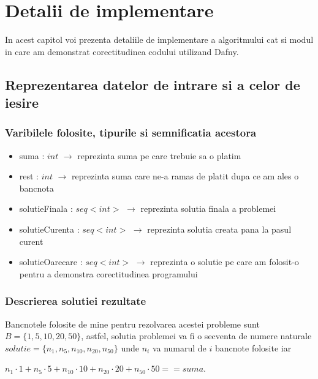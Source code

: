 
\chapter{Detalii de implementare}
In acest capitol voi prezenta detaliile de implementare a algoritmului cat si modul in care am demonstrat corectitudinea codului utilizand Dafny.
\section{Reprezentarea datelor de intrare si a celor de iesire}

\subsection{Varibilele folosite, tipurile si semnificatia acestora}

\begin{itemize}
	\item suma : $int$ $\rightarrow$ reprezinta suma pe care trebuie sa o platim 
	\item rest : $int$ $\rightarrow$ reprezinta suma care ne-a ramas de platit dupa ce am ales o bancnota
	\item solutieFinala : $seq<int>$ $\rightarrow$ reprezinta solutia finala a problemei 
	\item solutieCurenta : $seq<int>$ $\rightarrow$ reprezinta solutia creata pana la pasul curent
	\item solutieOarecare  : $seq<int>$ $\rightarrow$ reprezinta o solutie pe care am folosit-o pentru a demonstra corectitudinea programului
\end{itemize}

\subsection{Descrierea solutiei rezultate}
Bancnotele folosite de mine pentru rezolvarea acestei probleme sunt $B = \{1, 5, 10, 20, 50\}$, astfel, solutia problemei va fi o secventa de numere naturale $ solutie = \{n_1,n_5,n_{10},n_{20},n_{50} \}$ unde $n_i$ va numarul de $i$ bancnote folosite iar 
\begin{center}
	$n_1 \cdot 1 + n_5 \cdot 5 + n_{10} \cdot 10 + n_{20} \cdot 20 + n_{50} \cdot 50 == suma $.
\end{center}
\vspace{0.5cm}
